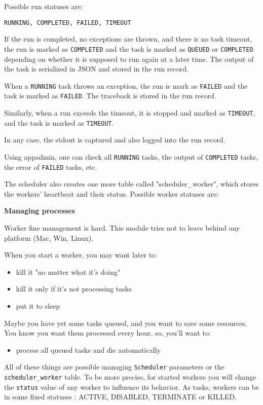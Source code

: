 \documentclass[justified,sixbynine,notoc]{tufte-book}
\def\ft{\small\tt}
\begin{document}
\begin{fullwidth}
Possible run statuses are:

\begin{lstlisting}
RUNNING, COMPLETED, FAILED, TIMEOUT
\end{lstlisting}

If the run is completed, no exceptions are thrown, and there is no task timeout, the run is marked as {\ft COMPLETED} and the task is marked as {\ft QUEUED} or {\ft COMPLETED} depending on whether it is supposed to run again at a later time. The output of the task is serialized in JSON and stored in the run record.

When a {\ft RUNNING} task throws an exception, the run is mark as {\ft FAILED} and the task is marked as {\ft FAILED}. The traceback is stored in the run record.

Similarly, when a run exceeds the timeout, it is stopped and marked as {\ft TIMEOUT}, and the task is marked as {\ft TIMEOUT}.

In any case, the stdout is captured and also logged into the run record.

Using appadmin, one can check all {\ft RUNNING} tasks, the output of {\ft COMPLETED} tasks, the error of {\ft FAILED} tasks, etc.

The scheduler also creates one more table called "scheduler\_worker", which stores the workers' heartbeat and their status. Possible worker statuses are:

{\bf Managing processes}

Worker fine management is hard. This module tries not to leave behind any platform (Mac, Win, Linux).

When you start a worker, you may want later to:
\begin{itemize}
\item kill it "no matter what it's doing"

\item kill it only if it's not processing tasks

\item put it to sleep
\end{itemize}
Maybe you have yet some tasks queued, and you want to save some resources.
You know you want them processed every hour, so, you'll want to:
\begin{itemize}
\item process all queued tasks and die automatically
\end{itemize}
All of these things are possible managing {\ft Scheduler} parameters or the {\ft scheduler\_worker} table.
To be more precise, for started workers you will change the {\ft status} value of any worker to influence
its behavior.
As tasks, workers can be in some fixed statuses : ACTIVE, DISABLED, TERMINATE or KILLED.


\end{fullwidth}
\end{document}
